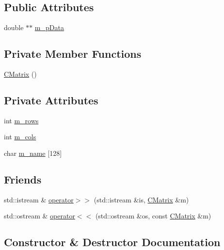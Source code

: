 \subsection*{Public Attributes}
\begin{DoxyCompactItemize}
\item 
double $\ast$$\ast$ \hyperlink{classCMatrix_ab0f18d68cad9b6d750d05a96b60a759d}{m\+\_\+p\+Data}
\end{DoxyCompactItemize}
\subsection*{Private Member Functions}
\begin{DoxyCompactItemize}
\item 
\hyperlink{classCMatrix_a720aa6a48296f4414ac7f9021bc420c4}{C\+Matrix} ()
\end{DoxyCompactItemize}
\subsection*{Private Attributes}
\begin{DoxyCompactItemize}
\item 
int \hyperlink{classCMatrix_ae23e5f8016ba06cfd1cce364a99f5037}{m\+\_\+rows}
\item 
int \hyperlink{classCMatrix_a723f752208c055093012984eaddb62d3}{m\+\_\+cols}
\item 
char \hyperlink{classCMatrix_aecd316cc4360014e817f7dc763aaa957}{m\+\_\+name} \mbox{[}128\mbox{]}
\end{DoxyCompactItemize}
\subsection*{Friends}
\begin{DoxyCompactItemize}
\item 
std\+::istream \& \hyperlink{classCMatrix_a775d8b5122da5b9fdea41520953a4237}{operator$>$$>$} (std\+::istream \&is, \hyperlink{classCMatrix}{C\+Matrix} \&m)
\item 
std\+::ostream \& \hyperlink{classCMatrix_a62d7be0784c5982bf356f96493281902}{operator$<$$<$} (std\+::ostream \&os, const \hyperlink{classCMatrix}{C\+Matrix} \&m)
\end{DoxyCompactItemize}


\subsection{Constructor \& Destructor Documentation}
